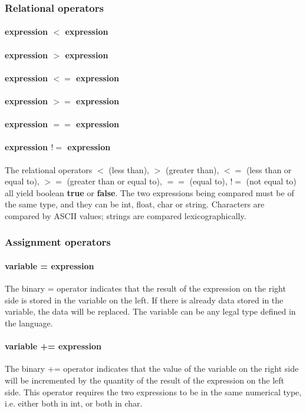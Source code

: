 \documentclass[a4paper,12pt]{article}
\begin{document}
\subsubsection{Relational operators}
\paragraph{expression $<$ expression}
\paragraph{expression $>$ expression}
\paragraph{expression $<=$ expression}
\paragraph{expression $>=$ expression}
\paragraph{expression $==$ expression}
\paragraph{expression $!=$ expression}
The relational operators $<$ (less than), $>$ (greater than), $<=$ (less than or equal to), $>=$ (greater than or equal to), $==$ (equal to), $!=$ (not equal to) all yield boolean \textbf{true} or \textbf{false}. The two expressions being compared must be of the same type, and they can be int, float, char or string. Characters are compared by ASCII values; strings are compared lexicographically.
\subsubsection{Assignment operators}
\paragraph{variable = expression}
The binary = operator indicates that the result of the expression on the right side is stored in the variable on the left. If there is already data stored in the variable, the data will be replaced. The variable can be any legal type defined in the language.
\paragraph{variable += expression}
The binary += operator indicates that the value of the variable on the right side will be incremented by the quantity of the result of the expression on the left side. This operator requires the two expressions to be in the same numerical type, i.e. either both in int, or both in char.
\end{document}
